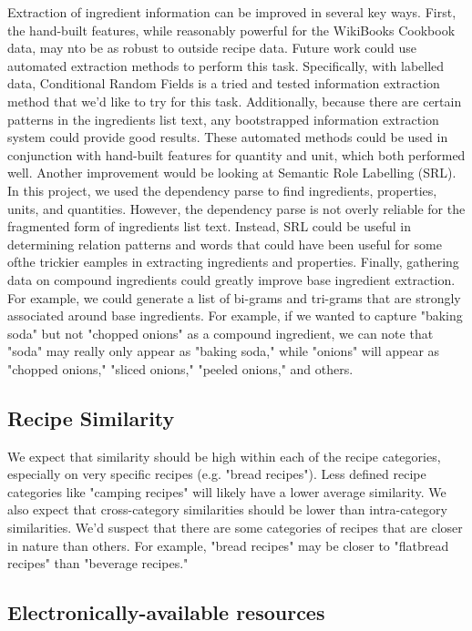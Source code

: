 \documentclass[11pt]{article}
\begin{document}
Extraction of ingredient information can be improved in several key ways. First, the hand-built features, while reasonably powerful for the WikiBooks Cookbook data, may nto be as robust to outside recipe data. Future work could use automated extraction methods to perform this task. Specifically, with labelled data, Conditional Random Fields is a tried and tested information extraction method that we'd like to try for this task. Additionally, because there are certain patterns in the ingredients list text, any bootstrapped information extraction system could provide good results. These automated methods could be used in conjunction with hand-built features for quantity and unit, which both performed well. Another improvement would be looking at Semantic Role Labelling (SRL). In this project, we used the dependency parse to find ingredients, properties, units, and quantities. However, the dependency parse is not overly reliable for the fragmented form of ingredients list text. Instead, SRL could be useful in determining relation patterns and words that could have been useful for some ofthe trickier eamples in extracting ingredients and properties. Finally, gathering data on compound ingredients could greatly improve base ingredient extraction. For example, we could generate a list of  bi-grams and tri-grams that are strongly associated around base ingredients. For example, if we wanted to capture "baking soda" but not "chopped onions" as a compound ingredient, we can note that "soda" may really only appear as "baking soda," while "onions" will appear as "chopped onions," "sliced onions," "peeled onions," and others.

\subsection{Recipe Similarity}

We expect that similarity should be high within each of the recipe categories, especially on very specific recipes (e.g. "bread recipes"). Less defined recipe categories like "camping recipes" will likely have a lower average similarity. We also expect that cross-category similarities should be lower than intra-category similarities. We'd suspect that there are some categories of recipes that are closer in nature than others. For example, "bread recipes" may be closer to "flatbread recipes" than "beverage recipes."

\subsection{Electronically-available resources}
\end{document}

